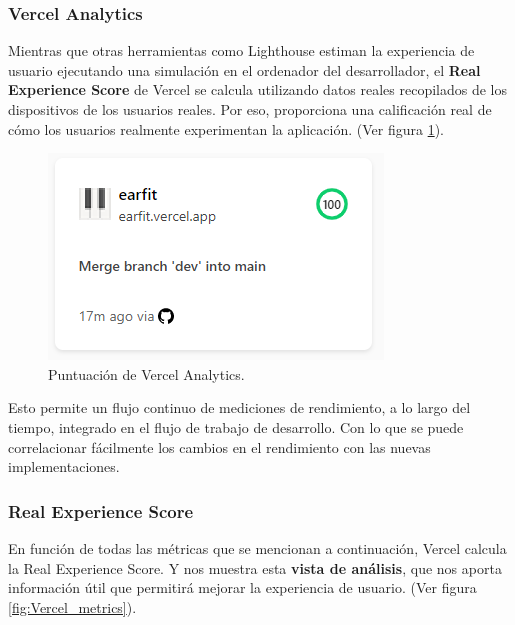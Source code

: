 \documentclass[12pt,twoside,titlepage]{report}
\begin{document}
\subsubsection{Vercel Analytics}
\label{sec:analytics}

Mientras que otras herramientas como Lighthouse estiman la experiencia de usuario ejecutando una simulación en el ordenador del desarrollador, el \textbf{Real Experience Score} de Vercel se calcula utilizando datos reales recopilados de los dispositivos de los usuarios reales. Por eso, proporciona una calificación real de cómo los usuarios realmente experimentan la aplicación.
(Ver figura \ref{fig:Vercel_metrics_resume}).

\begin{figure}[H]
    \centering
    \includegraphics[scale=0.8]{Vercel/VercelAnalyticsResume}
    \caption{Puntuación de Vercel Analytics.}
    \label{fig:Vercel_metrics_resume}
\end{figure}

Esto permite un flujo continuo de mediciones de rendimiento, a lo largo del tiempo, integrado en el flujo de trabajo de desarrollo. Con lo que se puede correlacionar fácilmente los cambios en el rendimiento con las nuevas implementaciones.

\subsubsection{Real Experience Score}

En función de todas las métricas que se mencionan a continuación, Vercel calcula la Real Experience Score. Y nos muestra esta \textbf{vista de análisis}, que nos aporta información útil que permitirá mejorar la experiencia de usuario.
(Ver figura \ref{fig:Vercel_metrics}).
\end{document}
